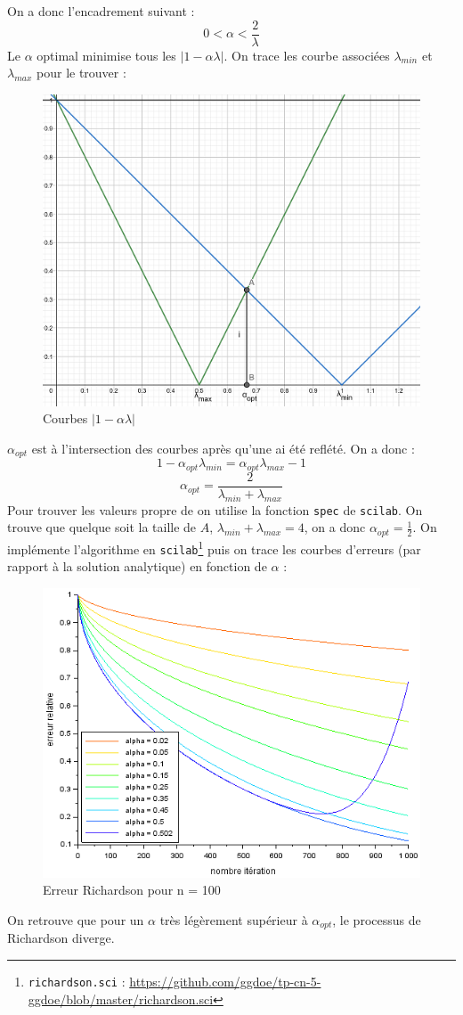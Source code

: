 \documentclass{article}
\begin{document}
On a donc l'encadrement suivant :
\[
	0 < \alpha < \frac{2}{\lambda}
\]
Le $\alpha$ optimal minimise tous les $\left| 1 - \alpha \lambda \right|$. On trace les courbe associées $\lambda_{min}$ et $\lambda_{max}$ pour le trouver :
\begin{figure}[H]
\caption{Courbes $\left| 1 - \alpha \lambda \right|$}
\centering
\includegraphics[scale=0.70]{alpha_opt}
\end{figure}
$\alpha_{opt}$ est à l'intersection des courbes après qu'une ai été reflété. On a donc :
\[
	1 - \alpha_{opt} \lambda_{min} = \alpha_{opt} \lambda_{max} - 1
\]
\[
	\alpha_{opt} = \frac{2}{\lambda_{min} + \lambda_{max}}
\]
Pour trouver les valeurs propre de on utilise la fonction \texttt{spec} de \texttt{scilab}. On trouve que quelque soit la taille de $A$, $\lambda_{min} + \lambda_{max} = 4$, on a donc $\alpha_{opt} = \frac{1}{2}$.
On implémente l'algorithme en \texttt{scilab}\footnote{\texttt{richardson.sci} : \href{https://github.com/ggdoe/tp-cn-5-ggdoe/blob/master/richardson.sci}{https://github.com/ggdoe/tp-cn-5-ggdoe/blob/master/richardson.sci}} puis on trace les courbes d'erreurs (par rapport à la solution analytique) en fonction de $\alpha$ :
\begin{figure}[H]
\caption{Erreur Richardson pour n = 100}
\centering
\includegraphics[scale=0.70]{conv_richardson_n100}
\end{figure}
On retrouve que pour un $\alpha$ très légèrement supérieur à $\alpha_{opt}$, le processus de Richardson diverge.
\end{document}
